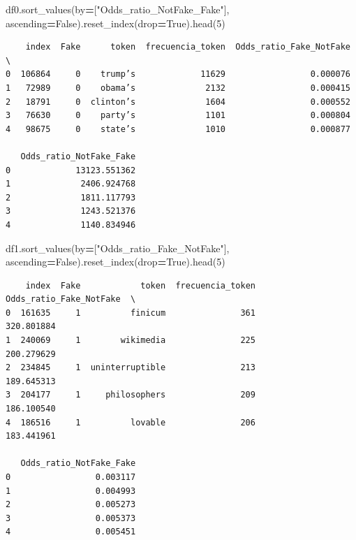 \documentclass[
  11pt,
  a4paper,
]{article}
\newenvironment{Shaded}{\begin{snugshade}}{\end{snugshade}}
\newcommand{\DecValTok}[1]{\textcolor[rgb]{0.00,0.00,0.81}{#1}}
\newcommand{\NormalTok}[1]{#1}
\newcommand{\OperatorTok}[1]{\textcolor[rgb]{0.81,0.36,0.00}{\textbf{#1}}}
\newcommand{\StringTok}[1]{\textcolor[rgb]{0.31,0.60,0.02}{#1}}
\newcommand{\VariableTok}[1]{\textcolor[rgb]{0.00,0.00,0.00}{#1}}
\begin{document}
\begin{Shaded}
\begin{Highlighting}[]
\NormalTok{df0.sort\_values(by}\OperatorTok{=}\NormalTok{[}\StringTok{"Odds\_ratio\_NotFake\_Fake"}\NormalTok{], ascending}\OperatorTok{=}\VariableTok{False}\NormalTok{).reset\_index(drop}\OperatorTok{=}\VariableTok{True}\NormalTok{).head(}\DecValTok{5}\NormalTok{)}
\end{Highlighting}
\end{Shaded}

\begin{verbatim}
    index  Fake      token  frecuencia_token  Odds_ratio_Fake_NotFake  \
0  106864     0    trump’s             11629                 0.000076   
1   72989     0    obama’s              2132                 0.000415   
2   18791     0  clinton’s              1604                 0.000552   
3   76630     0    party’s              1101                 0.000804   
4   98675     0    state’s              1010                 0.000877   

   Odds_ratio_NotFake_Fake  
0             13123.551362  
1              2406.924768  
2              1811.117793  
3              1243.521376  
4              1140.834946
\end{verbatim}

\begin{Shaded}
\begin{Highlighting}[]
\NormalTok{df1.sort\_values(by}\OperatorTok{=}\NormalTok{[}\StringTok{"Odds\_ratio\_Fake\_NotFake"}\NormalTok{], ascending}\OperatorTok{=}\VariableTok{False}\NormalTok{).reset\_index(drop}\OperatorTok{=}\VariableTok{True}\NormalTok{).head(}\DecValTok{5}\NormalTok{)}
\end{Highlighting}
\end{Shaded}

\begin{verbatim}
    index  Fake            token  frecuencia_token  Odds_ratio_Fake_NotFake  \
0  161635     1          finicum               361               320.801884   
1  240069     1        wikimedia               225               200.279629   
2  234845     1  uninterruptible               213               189.645313   
3  204177     1     philosophers               209               186.100540   
4  186516     1          lovable               206               183.441961   

   Odds_ratio_NotFake_Fake  
0                 0.003117  
1                 0.004993  
2                 0.005273  
3                 0.005373  
4                 0.005451
\end{verbatim}
\end{document}
